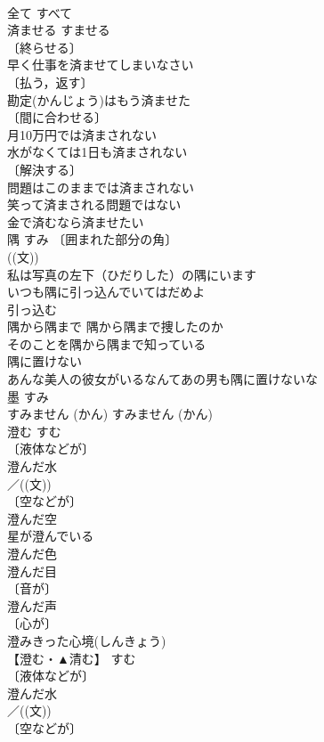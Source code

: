 \documentclass[8pt]{extreport}
\begin{document}
\begin{CJK}{UTF8}{min}
\\	全て	すべて	
\\	済ませる	すませる	
\\	〔終らせる〕
\\	早く仕事を済ませてしまいなさい 
\\	〔払う，返す〕
\\	勘定(かんじょう)はもう済ませた 
\\	〔間に合わせる〕
\\	月10万円では済まされない 
\\	水がなくては1日も済まされない 
\\	〔解決する〕
\\	問題はこのままでは済まされない 
\\	笑って済まされる問題ではない 
\\	金で済むなら済ませたい 
\\	隅	すみ	〔囲まれた部分の角〕
\\	((文)) 
\\	私は写真の左下（ひだりした）の隅にいます 
\\	いつも隅に引っ込んでいてはだめよ 
\\	引っ込む　
\\	隅から隅まで 隅から隅まで捜したのか 
\\	そのことを隅から隅まで知っている 
\\	隅に置けない　
\\	あんな美人の彼女がいるなんてあの男も隅に置けないな 
\\	墨	すみ	
\\	すみません (かん)	すみません (かん)	
\\	澄む	すむ	
\\	〔液体などが〕
\\	澄んだ水 
\\	／((文))
\\	〔空などが〕
\\	澄んだ空 
\\	星が澄んでいる 
\\	澄んだ色 
\\	澄んだ目 
\\	〔音が〕
\\	澄んだ声 
\\	〔心が〕
\\	澄みきった心境(しんきょう) 
\\	【澄む・▲清む】	すむ	
\\	〔液体などが〕
\\	澄んだ水 
\\	／((文))
\\	〔空などが〕

\end{CJK}
\end{document}
